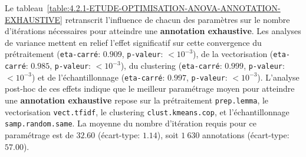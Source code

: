 			Le tableau~\ref{table:4.2.1-ETUDE-OPTIMISATION-ANOVA-ANNOTATION-EXHAUSTIVE} retranscrit l'influence de chacun des paramètres sur le nombre d'itérations nécessaires pour atteindre une \textbf{annotation exhaustive}.
			Les analyses de variance mettent en relief l'effet significatif sur cette convergence du prétraitement (\texttt{eta-carré}: $0.909$, \texttt{p-valeur}: $< 10^{-3}$), de la vectorisation (\texttt{eta-carré}: $0.985$, \texttt{p-valeur}: $< 10^{-3}$), du clustering (\texttt{eta-carré}: $0.999$, \texttt{p-valeur}: $< 10^{-3}$) et de l'échantillonnage (\texttt{eta-carré}: $0.997$, \texttt{p-valeur}: $< 10^{-3}$).
			L'analyse post-hoc de ces effets indique que le meilleur paramétrage moyen pour atteindre une \textbf{annotation exhaustive} repose sur la prétraitement \texttt{prep.lemma}, le vectorisation \texttt{vect.tfidf}, le clustering \texttt{clust.kmeans.cop}, et l'échantillonnage \texttt{samp.random.same}. La moyenne du nombre d'itération requis pour ce paramétrage est de $32.60$ (écart-type: $1.14$), soit $1~630$ annotations (écart-type: $57.00$).
